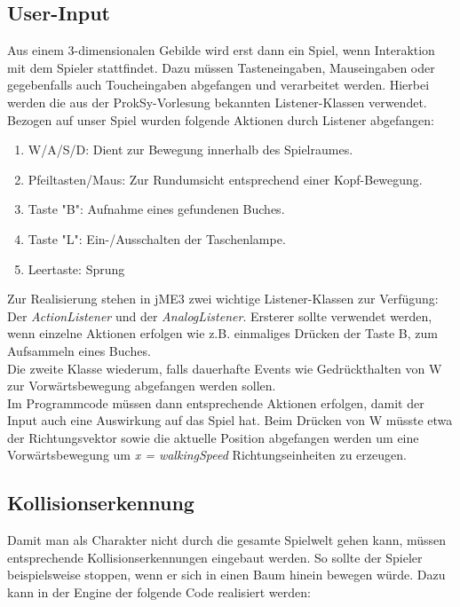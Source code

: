 \subsection{User-Input}

Aus einem 3-dimensionalen Gebilde wird erst dann ein Spiel, wenn Interaktion mit dem Spieler stattfindet. Dazu müssen Tasteneingaben, Mauseingaben oder gegebenfalls auch Toucheingaben abgefangen und verarbeitet werden.
Hierbei werden die aus der ProkSy-Vorlesung bekannten Listener-Klassen verwendet.
Bezogen auf unser Spiel wurden folgende Aktionen durch Listener abgefangen:
\begin{enumerate}
	\item W/A/S/D: Dient zur Bewegung innerhalb des Spielraumes.
	\item Pfeiltasten/Maus: Zur Rundumsicht entsprechend einer Kopf-Bewegung.
	\item Taste "B": Aufnahme eines gefundenen Buches.
	\item Taste "L": Ein-/Ausschalten der Taschenlampe.
	\item Leertaste: Sprung
\end{enumerate} Zur Realisierung stehen in jME3 zwei wichtige Listener-Klassen zur Verfügung: Der \emph{ActionListener} und der \emph{AnalogListener}.
Ersterer sollte verwendet werden, wenn einzelne Aktionen erfolgen wie z.B. einmaliges Drücken der Taste B, zum Aufsammeln eines Buches.\\
Die zweite Klasse wiederum, falls dauerhafte Events wie Gedrückthalten von W zur Vorwärtsbewegung abgefangen werden sollen. \\
Im Programmcode müssen dann entsprechende Aktionen erfolgen, damit der Input auch eine Auswirkung auf das Spiel hat. Beim Drücken von W müsste etwa der Richtungsvektor sowie die aktuelle Position abgefangen werden um eine Vorwärtsbewegung um \emph{x = walkingSpeed} Richtungseinheiten zu erzeugen.

\subsection{Kollisionserkennung}
Damit man als Charakter nicht durch die gesamte Spielwelt gehen kann, müssen entsprechende Kollisionserkennungen eingebaut werden. So sollte der Spieler beispielsweise stoppen, wenn er sich in einen Baum hinein bewegen würde. Dazu kann in der Engine der folgende Code realisiert werden:



